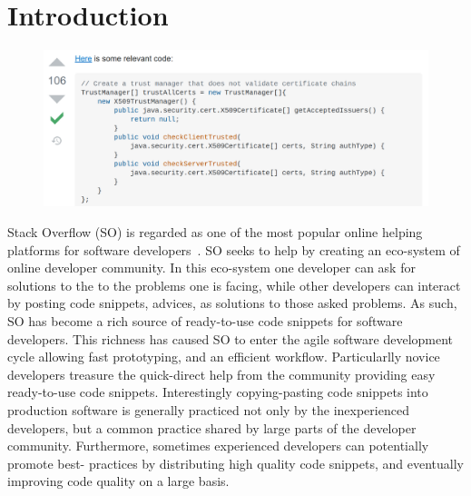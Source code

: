 \section{Introduction}
   \label{into}

   \begin{figure}
   \includegraphics[width=\linewidth]{Figures/SO_ss_2.png}
   \caption{}
   \label{fig:SO_screenshot}
   \end{figure}
   
   Stack Overflow (SO) is regarded as one of the most popular online helping platforms for software developers~\cite{8816778}. 
   SO seeks to help by creating an eco-system of online developer community. 
   In this eco-system one developer can ask for solutions to the to the problems one is facing, while other developers can interact by posting code snippets, advices, as solutions to those asked problems. 
   As such, SO has become a rich source of ready-to-use code snippets for software developers. 
   This richness has caused SO to enter the agile software development cycle allowing fast prototyping, and an efficient workflow. Particularlly novice developers treasure the quick-direct help from the community providing easy ready-to-use code snippets.
   Interestingly copying-pasting code snippets into production software is generally practiced not only by the inexperienced developers, but a common practice shared by large parts of the developer community. Furthermore, sometimes experienced developers can potentially promote best- practices by distributing high quality code snippets, and eventually improving code quality on a large basis.

